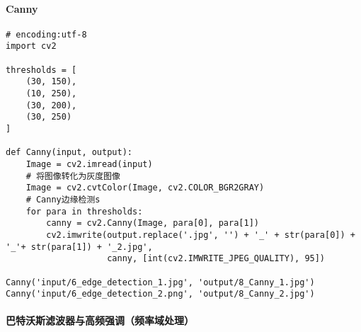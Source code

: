 \documentclass[11pt]{ctexart}
\begin{document}
\paragraph{Canny}

\lstset{language=python}
\begin{lstlisting}
# encoding:utf-8
import cv2

thresholds = [
	(30, 150),
	(10, 250),
	(30, 200),
	(30, 250)
]

def Canny(input, output):
	Image = cv2.imread(input)
	# 将图像转化为灰度图像
	Image = cv2.cvtColor(Image, cv2.COLOR_BGR2GRAY)
	# Canny边缘检测s
	for para in thresholds:
		canny = cv2.Canny(Image, para[0], para[1])
		cv2.imwrite(output.replace('.jpg', '') + '_' + str(para[0]) + '_'+ str(para[1]) + '_2.jpg',
		            canny, [int(cv2.IMWRITE_JPEG_QUALITY), 95])

Canny('input/6_edge_detection_1.jpg', 'output/8_Canny_1.jpg')
Canny('input/6_edge_detection_2.png', 'output/8_Canny_2.jpg')
\end{lstlisting}

\paragraph{巴特沃斯滤波器与高频强调（频率域处理）}
\end{document}
